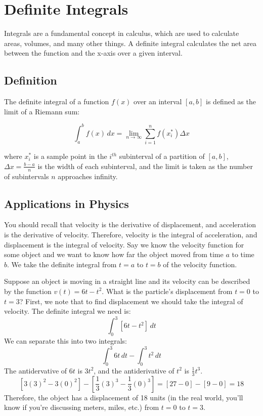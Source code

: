 \chapter{Definite Integrals}

Integrals are a fundamental concept in calculus, which are used to
calculate areas, volumes, and many other things. A definite integral
calculates the net area between the function and the x-axis over a
given interval.

\section{Definition}

The definite integral of a function $f(x)$ over an interval $[a, b]$
is defined as the limit of a Riemann sum:

\begin{equation}
\int_{a}^{b} f(x) \, dx = \lim_{{n \to \infty}} \sum_{i=1}^{n} f(x_i^*) \Delta x
\end{equation}

where $x_i^*$ is a sample point in the $i^{th}$ subinterval of a
partition of $[a, b]$, $\Delta x = \frac{b-a}{n}$ is the width of each
subinterval, and the limit is taken as the number of subintervals $n$
approaches infinity.

\section{Applications in Physics}
You should recall that velocity is the derivative of displacement, and acceleration is the derivative of velocity. Therefore, velocity is the integral of acceleration, and displacement is the integral of velocity. Say we know the velocity function for some object and we want to know how far the object moved from time $a$ to time $b$. We take the definite integral from $t=a$ to $t=b$ of the velocity function. 

Suppose an object is moving in a straight line and its velocity can be described by the function $v(t) = 6t-t^2$. What is the particle's displacement from $t=0$ to $t=3$? First, we note that to find displacement we should take the integral of velocity. The definite integral we need is:
$$\int_{0}^{3} [6t-t^2]\,dt$$
We can separate this into two integrals:
$$\int_{0}^{3} 6t\,dt -\int_{0}^{3}t^2\,dt$$
The antidervative of $6t$ is $3t^2$, and the antiderivative of $t^2$ is $\frac{1}{3}t^3$. 
$$[3(3)^2-3(0)^2]-[\frac{1}{3}(3)^3-\frac{1}{3}(0)^3]=[27-0]-[9-0]=18$$
Therefore, the object has a displacement of 18 units (in the real world, you'll know if you're discussing meters, miles, etc.) from $t=0$ to $t=3$. 

